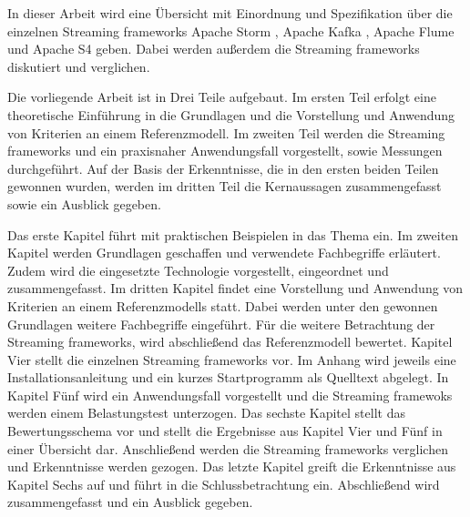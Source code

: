 In dieser Arbeit wird eine Übersicht mit Einordnung und Spezifikation über die einzelnen Streaming frameworks Apache Storm , Apache Kafka , Apache Flume  und Apache S4  geben. Dabei werden außerdem die Streaming frameworks diskutiert und verglichen. 


Die vorliegende Arbeit ist in Drei Teile aufgebaut. Im ersten Teil erfolgt eine theoretische Einführung in die Grundlagen und die Vorstellung und Anwendung von Kriterien an einem Referenzmodell. Im zweiten Teil werden die Streaming frameworks und ein praxisnaher Anwendungsfall vorgestellt, sowie Messungen durchgeführt. 
Auf der Basis der Erkenntnisse, die in den ersten beiden Teilen gewonnen wurden, werden im dritten Teil die Kernaussagen zusammengefasst sowie ein Ausblick gegeben.

Das erste Kapitel führt mit praktischen Beispielen in das Thema ein. Im zweiten Kapitel werden Grundlagen geschaffen und verwendete Fachbegriffe erläutert. Zudem wird die eingesetzte Technologie vorgestellt, eingeordnet und zusammengefasst. 
Im dritten Kapitel findet eine Vorstellung und Anwendung von Kriterien an einem Referenzmodells statt. Dabei werden unter den gewonnen Grundlagen weitere Fachbegriffe eingeführt. Für die weitere Betrachtung der Streaming frameworks, wird abschließend das Referenzmodell bewertet.
Kapitel Vier stellt die einzelnen Streaming frameworks vor. Im Anhang wird jeweils eine Installationsanleitung und ein kurzes Startprogramm als Quelltext abgelegt.
In Kapitel Fünf wird ein Anwendungsfall vorgestellt und die Streaming framewoks werden einem Belastungstest unterzogen.
Das sechste Kapitel stellt das Bewertungsschema vor und stellt die Ergebnisse aus Kapitel Vier und Fünf in einer Übersicht dar. Anschließend werden die Streaming frameworks verglichen und Erkenntnisse werden gezogen.
Das letzte Kapitel greift die Erkenntnisse aus Kapitel Sechs auf und führt in die Schlussbetrachtung ein. Abschließend wird zusammengefasst und ein Ausblick gegeben.